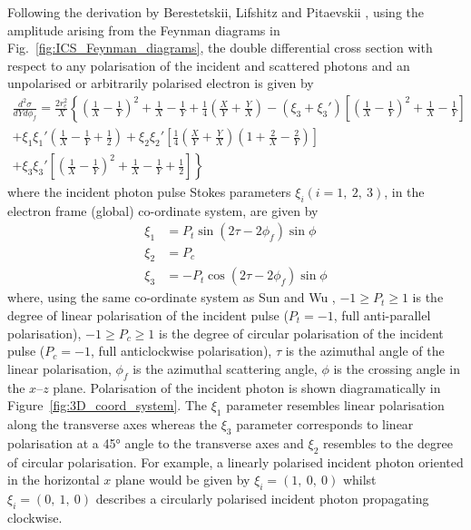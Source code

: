 \documentclass[../main.tex]{subfiles}
\begin{document}
Following the derivation by Berestetskii, Lifshitz and Pitaevskii \cite{berestetskii1982quantum}, using the amplitude arising from the Feynman diagrams in Fig.~\ref{fig:ICS_Feynman_diagrams}, the double differential cross section with respect to any polarisation of the incident and scattered photons and an unpolarised or arbitrarily polarised electron is given by 
\begin{multline}
\frac{d^{2}\sigma}{dYd\phi_{f}} = \frac{2r_{e}^{2}}{X}\left\{\left(\frac{1}{X}-\frac{1}{Y}\right)^{2}+\frac{1}{X}-\frac{1}{Y}+\frac{1}{4}\left(\frac{X}{Y}+\frac{Y}{X}\right)  -\left(\xi_{3}+\xi_{3}'\right)\left[\left(\frac{1}{X}-\frac{1}{Y}\right)^{2}+\frac{1}{X}-\frac{1}{Y}\right] \right.\\\left. +\xi_{1}\xi_{1}'\left(\frac{1}{X}-\frac{1}{Y}+\frac{1}{2}\right) + \xi_{2}\xi_{2}'\left[\frac{1}{4}\left(\frac{X}{Y}+\frac{Y}{X}\right)\left(1+\frac{2}{X}-\frac{2}{Y}\right)\right] \right.\\\left. + \xi_{3}\xi_{3}'\left[\left(\frac{1}{X}-\frac{1}{Y}\right)^{2}+\frac{1}{X}-\frac{1}{Y}+\frac{1}{2}\right] \right\}
\label{eq:polarisation_differential_cross_section}    
\end{multline}
where the incident photon pulse Stokes parameters $\xi_{i} \left(i=1,~2,~3\right)$, in the electron frame (global) co-ordinate system, are given by
\begin{align}
\xi_{1} &= P_{t}\sin\left(2\tau-2\phi_{f}\right)\sin\phi\\
\xi_{2} &= P_{c} \\
\xi_{3} &= -P_{t}\cos\left(2\tau-2\phi_{f}\right)\sin\phi
\label{eq:incident_stokes_parameters}    
\end{align}
where, using the same co-ordinate system as Sun and Wu \cite{sun2009characterizations,sun2011theoretical}, $-1 \geq P_{t} \geq 1$ is the degree of linear polarisation of the incident pulse ($P_{t}=-1$, full anti-parallel polarisation), $-1 \geq P_{c} \geq 1$ is the degree of circular polarisation of the incident pulse ($P_{c}=-1$, full anticlockwise polarisation), $\tau$ is the azimuthal angle of the linear polarisation, $\phi_{f}$ is the azimuthal scattering angle, $\phi$ is the crossing angle in the $x$--$z$ plane. Polarisation of the incident photon is shown diagramatically in Figure~\ref{fig:3D_coord_system}. The $\xi_{1}$ parameter resembles linear polarisation along the transverse axes whereas the $\xi_{3}$ parameter corresponds to linear polarisation at a 45\si{\degree} angle to the transverse axes and $\xi_{2}$ resembles to the degree of circular polarisation. For example, a linearly polarised incident photon oriented in the horizontal $x$ plane would be given by $\xi_{i} = \left(1,~0,~0\right)$ whilst $\xi_{i} = \left(0,~1,~0\right)$ describes a circularly polarised incident photon propagating clockwise. 
\end{document}
